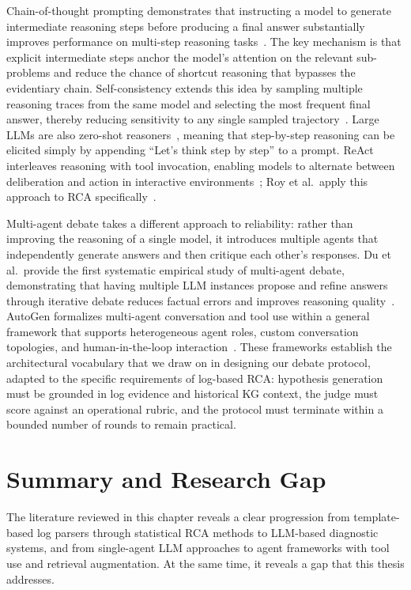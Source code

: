 Chain-of-thought prompting demonstrates that instructing a model to generate intermediate reasoning
steps before producing a final answer substantially improves performance on multi-step reasoning
tasks~\cite{wei2023chainofthoughtpromptingelicitsreasoning}. The key mechanism is that explicit
intermediate steps anchor the model's attention on the relevant sub-problems and reduce the chance
of shortcut reasoning that bypasses the evidentiary chain. Self-consistency extends this idea by
sampling multiple reasoning traces from the same model and selecting the most frequent final answer,
thereby reducing sensitivity to any single sampled
trajectory~\cite{wang2023selfconsistencyimproveschainthought}. Large LLMs are also zero-shot
reasoners~\cite{kojima2023largelanguagemodelszeroshot}, meaning that step-by-step reasoning can
be elicited simply by appending ``Let's think step by step'' to a prompt. ReAct interleaves
reasoning with tool invocation, enabling models to alternate between deliberation and action in
interactive environments~\cite{yao2023reactsynergizingreasoningacting}; Roy et al.\ apply this
approach to RCA specifically~\cite{roy2024llmagentRCA}.

Multi-agent debate takes a different approach to reliability: rather than improving the reasoning
of a single model, it introduces multiple agents that independently generate answers and then
critique each other's responses. Du et al.\ provide the first systematic empirical study of
multi-agent debate, demonstrating that having multiple LLM instances propose and refine answers
through iterative debate reduces factual errors and improves reasoning
quality~\cite{du2023improvingfactualityreasoninglanguage}. AutoGen formalizes multi-agent
conversation and tool use within a general framework that supports heterogeneous agent roles,
custom conversation topologies, and human-in-the-loop
interaction~\cite{wu2023autogen}. These frameworks establish the architectural vocabulary that
we draw on in designing our debate protocol, adapted to the specific requirements of log-based
RCA: hypothesis generation must be grounded in log evidence and historical KG context, the judge
must score against an operational rubric, and the protocol must terminate within a bounded number
of rounds to remain practical.

\section{Summary and Research Gap}

The literature reviewed in this chapter reveals a clear progression from template-based log
parsers through statistical RCA methods to LLM-based diagnostic systems, and from single-agent
LLM approaches to agent frameworks with tool use and retrieval augmentation. At the same time,
it reveals a gap that this thesis addresses.

